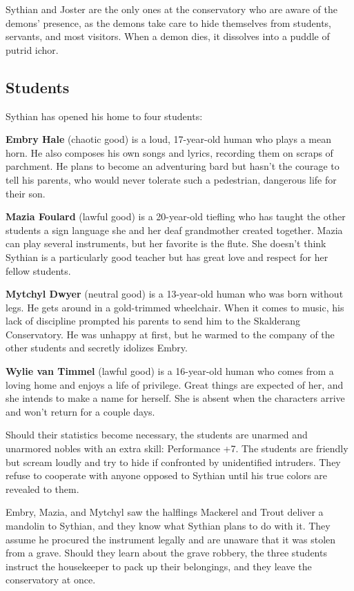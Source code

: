 \documentclass[10pt,a4paper,twoside,bg=print,twocolumn,openany,nodeprecatedcode]{dndbook}
\begin{document}
Sythian and Joster are the only ones at the conservatory who are aware of the demons' presence, as the demons take care to hide themselves from students, servants, and most visitors. When a demon dies, it dissolves into a puddle of putrid ichor.

\subsection{Students}
Sythian has opened his home to four students:

\textbf{Embry Hale} (chaotic good) is a loud, 17-year-old human who plays a mean horn. He also composes his own songs and lyrics, recording them on scraps of parchment. He plans to become an adventuring bard but hasn't the courage to tell his parents, who would never tolerate such a pedestrian, dangerous life for their son.

\textbf{Mazia Foulard} (lawful good) is a 20-year-old tiefling who has taught the other students a sign language she and her deaf grandmother created together. Mazia can play several instruments, but her favorite is the flute. She doesn't think Sythian is a particularly good teacher but has great love and respect for her fellow students.

\textbf{Mytchyl Dwyer} (neutral good) is a 13-year-old human who was born without legs. He gets around in a gold-trimmed wheelchair. When it comes to music, his lack of discipline prompted his parents to send him to the Skalderang Conservatory. He was unhappy at first, but he warmed to the company of the other students and secretly idolizes Embry.

\textbf{Wylie van Timmel} (lawful good) is a 16-year-old human who comes from a loving home and enjoys a life of privilege. Great things are expected of her, and she intends to make a name for herself. She is absent when the characters arrive and won't return for a couple days.

Should their statistics become necessary, the students are unarmed and unarmored nobles with an extra skill: Performance +7. The students are friendly but scream loudly and try to hide if confronted by unidentified intruders. They refuse to cooperate with anyone opposed to Sythian until his true colors are revealed to them.

Embry, Mazia, and Mytchyl saw the halflings Mackerel and Trout deliver a mandolin to Sythian, and they know what Sythian plans to do with it. They assume he procured the instrument legally and are unaware that it was stolen from a grave. Should they learn about the grave robbery, the three students instruct the housekeeper to pack up their belongings, and they leave the conservatory at once.
\end{document}
